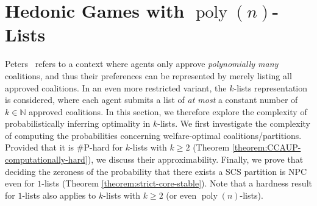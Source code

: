 \documentclass[letterpaper]{article}
\DeclareMathOperator*{\poly}{poly}
\begin{document}
\section{Hedonic Games with $\poly(n)$-Lists}
\label{sec:DHGs with $k$-Lists}
Peters~ refers to a context where agents only approve \textit{polynomially many} coalitions, and thus their preferences can be represented by merely listing all approved coalitions. In an even more restricted variant, the $k$-lists representation is considered, where each agent submits a list of \textit{at most} a constant number of $k \in \mathbb{N}$ approved coalitions. In this section, we therefore explore the complexity of probabilistically inferring optimality in $k$-lists. We first investigate the complexity of computing the probabilities concerning welfare-optimal coalitions/partitions. Provided that it is \#P-hard for $k$-lists with $k \geq 2$ (Theorem \ref{theorem:CCAUP-computationally-hard}), we discuss their approximability. Finally, we prove that deciding the zeroness of the probability that there exists a SCS partition is NPC even for $1$-lists (Theorem \ref{theorem:strict-core-stable}). Note that a hardness result for $1$-lists also applies to $k$-lists with $k \geq 2$ (or even $\poly(n)$-lists). %
\end{document}
